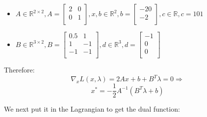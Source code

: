 \documentclass[12pt]{article}
\begin{document}
\begin{itemize}
  \item $A \in \mathbb{R}^{2 \times 2}, A = \begin{bmatrix}
               2 & 0 \\
               0 & 1 \\
  \end{bmatrix}, x,b \in \mathbb{R}^{2}, b = \begin{bmatrix}   -20 \\ -2\\ \end{bmatrix}, c \in \mathbb{R}, c= 101$ 
  \item $B \in \mathbb{R}^{3 \times 2}, B = \begin{bmatrix}
               0.5 & 1 \\
               1 & -1 \\
               -1 & -1 \\
  \end{bmatrix}, d \in \mathbb{R}^{3}, d = \begin{bmatrix}   -1 \\ 0\\ 0\\\end{bmatrix}$
\end{itemize}

Therefore:\\

$$\nabla_x L(x,\lambda) = 2Ax + b + B^T\lambda = 0 \Rightarrow$$
$$ x^* = -\frac{1}{2}A^{-1}(B^T\lambda + b)$$

We next put it in the Lagrangian to get the dual function:
\end{document}
